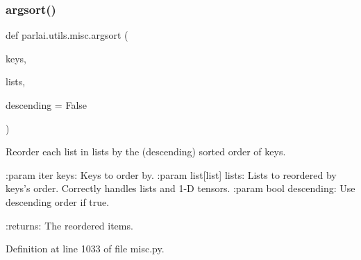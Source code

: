 \subsubsection{\texorpdfstring{argsort()}{argsort()}}
{\footnotesize\ttfamily def parlai.\+utils.\+misc.\+argsort (\begin{DoxyParamCaption}\item[{}]{keys,  }\item[{}]{lists,  }\item[{}]{descending = {\ttfamily False} }\end{DoxyParamCaption})}

\begin{DoxyVerb}Reorder each list in lists by the (descending) sorted order of keys.

:param iter keys:
    Keys to order by.
:param list[list] lists:
    Lists to reordered by keys's order.  Correctly handles lists and 1-D
    tensors.
:param bool descending:
    Use descending order if true.

:returns:
    The reordered items.
\end{DoxyVerb}
 

Definition at line 1033 of file misc.\+py.


